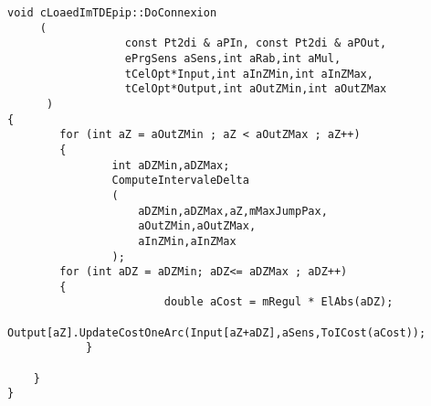 \begin{lstlisting}
void cLoaedImTDEpip::DoConnexion
     (
                  const Pt2di & aPIn, const Pt2di & aPOut,
                  ePrgSens aSens,int aRab,int aMul,
                  tCelOpt*Input,int aInZMin,int aInZMax,
                  tCelOpt*Output,int aOutZMin,int aOutZMax
      )
{
        for (int aZ = aOutZMin ; aZ < aOutZMax ; aZ++)
        {
                int aDZMin,aDZMax;
                ComputeIntervaleDelta
                (
                    aDZMin,aDZMax,aZ,mMaxJumpPax,
                    aOutZMin,aOutZMax,
                    aInZMin,aInZMax
                );
        for (int aDZ = aDZMin; aDZ<= aDZMax ; aDZ++)
        {
                        double aCost = mRegul * ElAbs(aDZ);
                        Output[aZ].UpdateCostOneArc(Input[aZ+aDZ],aSens,ToICost(aCost));
            }

    }
}
\end{lstlisting}




